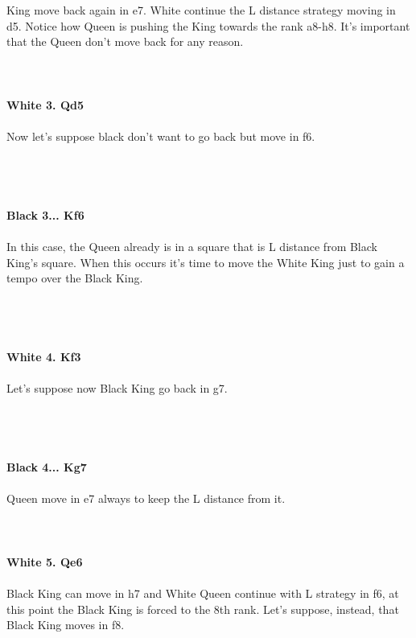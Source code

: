 \documentclass{article}
\begin{document}
King move back again in e7. White continue the L distance strategy moving in d5. Notice how Queen is pushing the King towards the rank a8-h8. It's important that the Queen don't move back for any reason.\\
\\

\\
\\
\textbf{White 3. Qd5}\\
\\
Now let's suppose black don't want to go back but move in f6.\\\\
\\

\\
\\
\textbf{Black 3... Kf6}\\
\\
In this case, the Queen already is in a square that is L distance from Black King's square. When this occurs it's time to move the White King just to gain a tempo over the Black King.\\\\
\\

\\
\\
\textbf{White 4. Kf3}\\
\\
Let's suppose now Black King go back in g7.\\\\
\\

\\
\\
\textbf{Black 4... Kg7}\\
\\
Queen move in e7 always to keep the L distance from it.\\
\\

\\
\\
\textbf{White 5. Qe6}\\
\\
Black King can move in h7 and White Queen continue with L strategy in f6, at this point the Black King is forced to the 8th rank. Let's suppose, instead, that Black King moves in f8.\\\\
\end{document}
